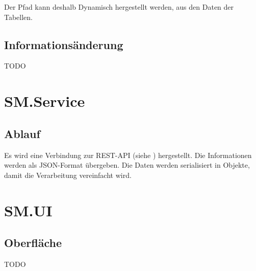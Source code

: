 \documentclass{article}
\begin{document}
Der Pfad kann deshalb Dynamisch hergestellt werden, aus den Daten der Tabellen.

\subsection{Informationsänderung}

TODO

\newpage

\section{SM.Service}

\subsection{Ablauf}

Es wird eine Verbindung zur REST-API (siehe \textit{}) hergestellt. Die Informationen werden als JSON-Format übergeben.
Die Daten werden serialisiert in Objekte, damit die Verarbeitung vereinfacht wird.

\newpage

\section{SM.UI}

\subsection{Oberfläche}

TODO
\end{document}
